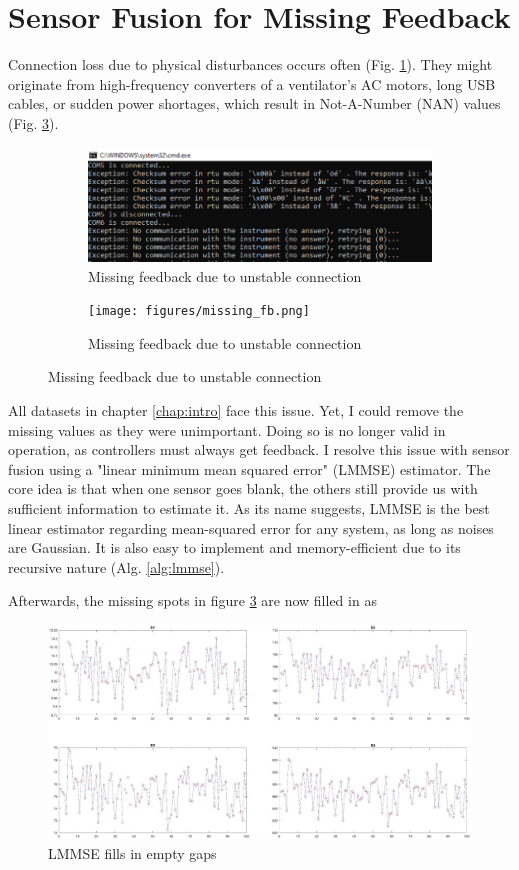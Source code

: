 \documentclass[../main.tex]{subfiles}
\begin{document}
\section{Sensor Fusion for Missing Feedback}
Connection loss due to physical disturbances occurs often (Fig. \ref{fig:conn_loss}). They might originate from high-frequency converters of a ventilator's AC motors, long USB cables, or sudden power shortages, which result in Not-A-Number (NAN) values (Fig. \ref{fig:missing_fb}).
\begin{figure}[htbp]
\centering
\begin{subfigure}{\textwidth}
    \includegraphics[width=\linewidth]{figures/conn_loss.png}
    \caption{Missing feedback due to unstable connection}
    \label{fig:conn_loss}
\end{subfigure}
\begin{subfigure}{\textwidth}
    \texttt{[image: figures/missing\_fb.png]}
    \caption{Missing feedback due to unstable connection}
    \label{fig:missing_fb}
\end{subfigure}
\end{figure}

All datasets in chapter \ref{chap:intro} face this issue. Yet, I could remove the missing values as they were unimportant. Doing so is no longer valid in operation, as controllers must always get feedback. I resolve this issue with sensor fusion using a "linear minimum mean squared error" (LMMSE) estimator. The core idea is that when one sensor goes blank, the others still provide us with sufficient information to estimate it. As its name suggests, LMMSE is the best linear estimator regarding mean-squared error for any system, as long as noises are Gaussian. It is also easy to implement and memory-efficient due to its recursive nature (Alg. \ref{alg:lmmse}).

Afterwards, the missing spots in figure \ref{fig:missing_fb} are now filled in as
\begin{figure}
    \centering
    \includegraphics[width=1\linewidth]{figures/lmmse.jpg}
    \caption{LMMSE fills in empty gaps}
    \label{fig:lmmse}
\end{figure}
\end{document}
